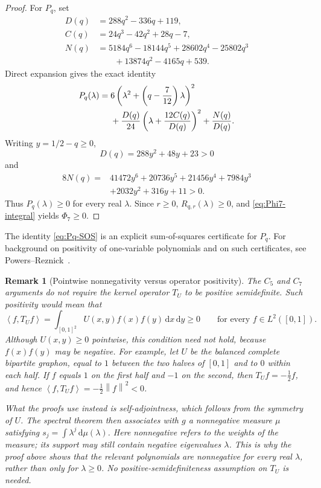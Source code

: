 ﻿\documentclass[11pt]{article}
\newtheorem{remark}[theorem]{Remark}
\numberwithin{equation}{section}
\newcommand{\ip}[2]{\left\langle #1,#2\right\rangle}
\newcommand{\norm}[1]{\left\lVert #1\right\rVert}
\newcommand{\dd}{\,\mathrm d}
\begin{document}
\begin{proof}
  For $P_q$, set
  \begin{align*}
    D(q)&=288q^2-336q+119,\\
    C(q)&=24q^3-42q^2+28q-7,\\
    N(q)&=5184q^6-18144q^5+28602q^4-25802q^3\\
    &\qquad+13874q^2-4165q+539.
  \end{align*}
  Direct expansion gives the exact identity
  \begin{align}
    P_q(\lambda)
    ={}&6\left(\lambda^2+\left(q-\frac{7}{12}\right)\lambda\right)^2 \notag\\
    &+\frac{D(q)}{24}
    \left(\lambda+\frac{12C(q)}{D(q)}\right)^2
    +\frac{N(q)}{D(q)}. \label{eq:Pq-SOS}
  \end{align}
  Writing $y=1/2-q\ge0$,
  \[
    D(q)=288y^2+48y+23>0
  \]
  and
  \begin{align*}
    8N(q)={}&41472y^6+20736y^5+21456y^4+7984y^3\\
    &+2032y^2+316y+11>0.
  \end{align*}
  Thus $P_q(\lambda)\ge0$ for every real $\lambda$.
  Since $r\ge0$, $R_{q,r}(\lambda)\ge0$, and \eqref{eq:Phi7-integral} yields $\Phi_7\ge0$.
\end{proof}

The identity \eqref{eq:Pq-SOS} is an explicit sum-of-squares certificate for $P_q$.
For background on positivity of one-variable polynomials and on such certificates, see Powers--Reznick~\cite{PowersReznick2000}.

\iffalse
\begin{remark}[Pointwise nonnegativity versus operator positivity]
  The $C_5$ and $C_7$ arguments do not require the kernel operator $T_U$ to be positive semidefinite.
  Such positivity would mean that
  \[
    \ip f{T_Uf}
    =\int_{[0,1]^2}U(x,y)f(x)f(y)\dd x\dd y\ge0
    \qquad\text{for every }f\in L^2([0,1]).
  \]
  Although $U(x,y)\ge0$ pointwise, this condition need not hold, because $f(x)f(y)$ may be negative.
  For example, let $U$ be the balanced complete bipartite graphon, equal to $1$ between the two halves of $[0,1]$ and to $0$ within each half.
  If $f$ equals $1$ on the first half and $-1$ on the second, then $T_Uf=-\tfrac{1}{2}f$, and hence $\ip f{T_Uf}=-\tfrac{1}{2}\norm f^2<0$.

  What the proofs use instead is self-adjointness, which follows from the symmetry of $U$.
  The spectral theorem then associates with $g$ a nonnegative measure $\mu$ satisfying $s_j=\int\lambda^j\dd\mu(\lambda)$.
  Here nonnegative refers to the weights of the measure; its support may still contain negative eigenvalues $\lambda$.
  This is why the proof above shows that the relevant polynomials are nonnegative for every real $\lambda$, rather than only for $\lambda\ge0$.
  No positive-semidefiniteness assumption on $T_U$ is needed.
\end{remark}
\end{document}
